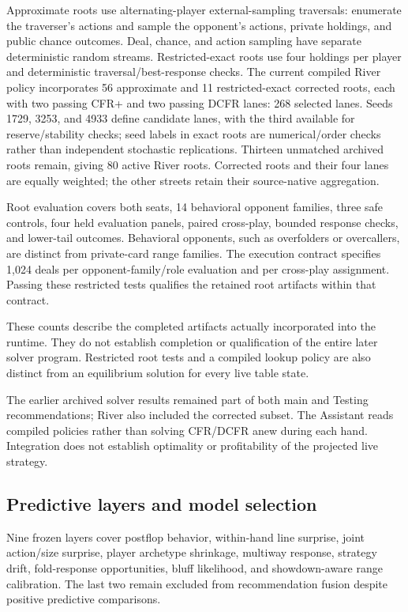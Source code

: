 \documentclass[11pt]{article}
\begin{document}
Approximate roots use alternating-player external-sampling traversals: enumerate the traverser's actions and sample the opponent's actions, private holdings, and public chance outcomes. Deal, chance, and action sampling have separate deterministic random streams. Restricted-exact roots use four holdings per player and deterministic traversal/best-response checks. The current compiled River policy incorporates 56 approximate and 11 restricted-exact corrected roots, each with two passing CFR+ and two passing DCFR lanes: 268 selected lanes. Seeds 1729, 3253, and 4933 define candidate lanes, with the third available for reserve/stability checks; seed labels in exact roots are numerical/order checks rather than independent stochastic replications. Thirteen unmatched archived roots remain, giving 80 active River roots. Corrected roots and their four lanes are equally weighted; the other streets retain their source-native aggregation.

Root evaluation covers both seats, 14 behavioral opponent families, three safe controls, four held evaluation panels, paired cross-play, bounded response checks, and lower-tail outcomes. Behavioral opponents, such as overfolders or overcallers, are distinct from private-card range families. The execution contract specifies 1,024 deals per opponent-family/role evaluation and per cross-play assignment. Passing these restricted tests qualifies the retained root artifacts within that contract.

These counts describe the completed artifacts actually incorporated into the runtime. They do not establish completion or qualification of the entire later solver program. Restricted root tests and a compiled lookup policy are also distinct from an equilibrium solution for every live table state.

The earlier archived solver results remained part of both main and Testing recommendations; River also included the corrected subset. The Assistant reads compiled policies rather than solving CFR/DCFR anew during each hand. Integration does not establish optimality or profitability of the projected live strategy.

\subsection{Predictive layers and model selection}
Nine frozen layers cover postflop behavior, within-hand line surprise, joint action/size surprise, player archetype shrinkage, multiway response, strategy drift, fold-response opportunities, bluff likelihood, and showdown-aware range calibration. The last two remain excluded from recommendation fusion despite positive predictive comparisons.
\end{document}
